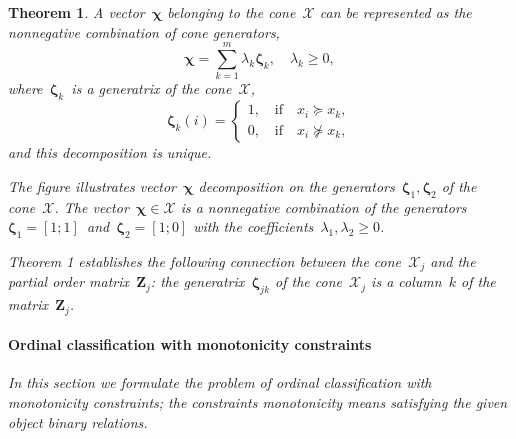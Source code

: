 \documentclass[12pt,preprint]{elsarticle}
\newcommand{\bZ}{\mathbf{Z}}
\newcommand{\bchi}{\boldsymbol{\chi}}
\newcommand{\bzeta}{\boldsymbol{\zeta}}
\newtheorem{Theorem}{Theorem}
\begin{document}
\begin{Theorem}
A vector~$\bchi$ belonging to the cone~$\mathcal{X}$ can be represented as the nonnegative combination of cone generators,
$$\bchi=\sum\limits_{k=1}^{m}\lambda_{k}\bzeta_{k}, \quad\lambda_{k}\geq 0,$$
where~$\bzeta_k$~is a generatrix of the cone~$\mathcal{X}$,
\[
\bzeta_{k}(i)=
\begin{cases}
1,\quad \text{if}\quad x_i\succeq x_k,\\
0,\quad\text{if}\quad x_i\nsucceq x_k,
\end{cases}
\]
and this decomposition is unique.



The figure illustrates vector~$\bchi$ decomposition on the generators~$\bzeta_1,\bzeta_2$ of the cone~$\mathcal{X}$. The vector~$\bchi\in \mathcal{X}$ is a nonnegative combination of the generators~$\bzeta_1=[1;1]$~and~$\bzeta_2=[1;0]$ with the coefficients~$\lambda_1,\lambda_2\geq 0$.

Theorem 1 establishes the following connection between the cone~$\mathcal{X}_j$ and the partial order matrix~$\bZ_j$: the generatrix~$\bzeta_{jk}$ of the cone~$\mathcal{X}_j$ is a column~$k$ of the matrix~$\bZ_j$.

\paragraph{Ordinal classification with monotonicity constraints}
In this section we formulate the problem of ordinal classification with monotonicity constraints; the constraints monotonicity means satisfying the given object binary relations.


\end{Theorem}
\end{document}
